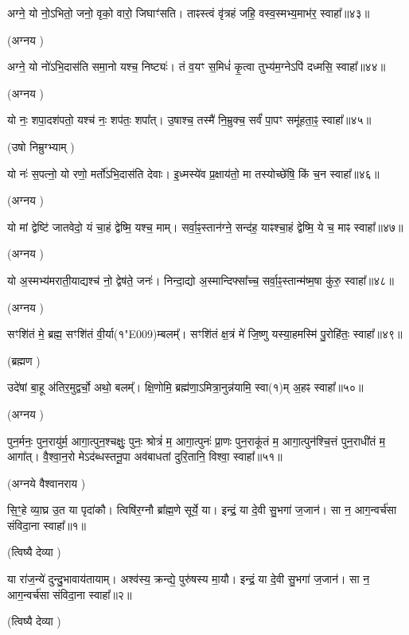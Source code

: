 अग्ने॒ यो नो॒ऽभितो॒ जनो॒ वृको॒ वारो॒ जिघाꣳ॑सति। 
ताꣴस्त्वं वृ॑त्रहं जहि॒ वस्व॒स्मभ्य॒माभ॑र॒ स्वाहा᳚॥४३॥

(अग्नय \idam)


अग्ने॒ यो नो॑ऽभि॒दास॑ति समा॒नो यश्च॒ निष्ट्यः॑। 
तं व॒यꣳ स॒मिधं॑ कृ॒त्वा तुभ्य॑म॒ग्नेऽपि॑ दध्मसि॒ स्वाहा᳚॥४४॥

(अग्नय \idam)


यो नः॒ शपा॒दश॑पतो॒ यश्च॑ नः॒ शप॑तः॒ शपा᳚त्। 
उ॒षाश्च॒ तस्मै॑ नि॒म्रुक्च॒ सर्वं॑ पा॒पꣳ समू॑हता॒ꣴ॒ स्वाहा᳚॥४५॥

(उषो निम्रुग्भ्याम् \idam)


यो नः॑ स॒पत्नो॒ यो रणो॒ मर्तो॑ऽभि॒दास॑ति देवाः। 
इ॒ध्मस्ये॑व प्र॒क्षाय॑तो॒ मा तस्योच्छे॑षि॒ किं च॒न स्वाहा᳚॥४६॥

(अग्नय \idam)


यो मां द्वेष्टि॑ जातवेदो॒ यं चा॒हं द्वेष्मि॒ यश्च॒ माम्। 
सर्वा॒ꣴ॒स्तान॑ग्ने॒ सन्द॑ह॒ याꣴश्चा॒हं द्वेष्मि॒ ये च॒ माꣴ स्वाहा᳚॥४७॥

(अग्नय \idam)


यो अ॒स्मभ्य॑मराती॒याद्यश्च॑ नो॒ द्वेष॑ते॒ जनः॑। 
निन्दा॒द्यो अ॒स्मान्दिफ्सा᳚च्च॒ सर्वा॒ꣴ॒स्तान्म॑ष्म॒षा कु॑रु॒ स्वाहा᳚॥४८॥

(अग्नय \idam)


सꣳशि॑तं मे॒ ब्रह्म॒ सꣳशि॑तं वी॒र्या(१\char"E009)म्बलम्᳚। 
सꣳशि॑तं क्ष॒त्रं मे॑ जि॒ष्णु यस्या॒हमस्मि॑ पु॒रोहि॑तः॒ स्वाहा᳚॥४९॥

(ब्रह्मण \idam)


उदे॑षां बा॒हू अ॑तिर॒मुद्वर्चो॒ अथो॒ बलम्᳚। 
क्षि॒णोमि॒ ब्रह्म॑णा॒ऽमित्रा॒नुन्न॑\-यामि॒ स्वा(१)म् अ॒हꣴ स्वाहा᳚॥५०॥

(अग्नय \idam)


पुन॒र्मनः॒ पुन॒रायु॑र्म॒ आगा॒त्पुन॒श्चक्षुः॒ पुनः॒ श्रोत्रं॑ म॒ आगा॒त्पुनः॑ प्रा॒णः पुन॒राकू॑तं म॒ आगा॒त्पुन॑श्चि॒त्तं पुन॒राधी॑तं म॒ आगा᳚त्। 
वै॒श्वा॒न॒रो मेऽद॑ब्धस्तनू॒पा अव॑बाधतां दुरि॒तानि॒ विश्वा॒ स्वाहा᳚॥५१॥

(अग्नये वैश्वानराय \idam)



सि॒ꣳ॒हे व्या॒घ्र उ॒त या पृदा॑कौ।
त्विषि॑र॒ग्नौ ब्रा᳚ह्म॒णे सूर्ये॒ या।
इन्द्रं॒ या दे॒वी सु॒भगा॑ ज॒जान॑।
सा न॒ आग॒न्वर्च॑सा संविदा॒ना स्वाहा᳚॥१॥

(त्विष्यै देव्या \idam)


या रा॑ज॒न्ये॑ दुन्दु॒भावाय॑तायाम्।
अश्व॑स्य॒ क्रन्द्ये॒ पुरु॑षस्य मा॒यौ।
इन्द्रं॒ या दे॒वी सु॒भगा॑ ज॒जान॑।
सा न॒ आग॒न्वर्च॑सा संविदा॒ना स्वाहा᳚॥२॥

(त्विष्यै देव्या \idam)

